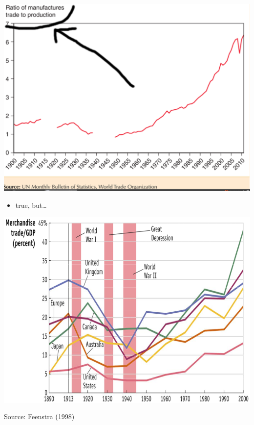 \documentclass[ignorenonframetext,]{beamer}
\begin{document}
\begin{frame}

    \includegraphics[scale=0.25]{Text_fig_2_5_tricky.png}

\end{frame}

\begin{frame}

    \begin{itemize}
        \itemsep1pt\parskip0pt
        \item true, but\dots
    \end{itemize}
   
    \includegraphics[scale=0.25]{trade_to_gdp_historical.png}

    {\tiny Source: Feenstra (1998)}

\end{frame}
\end{document}
